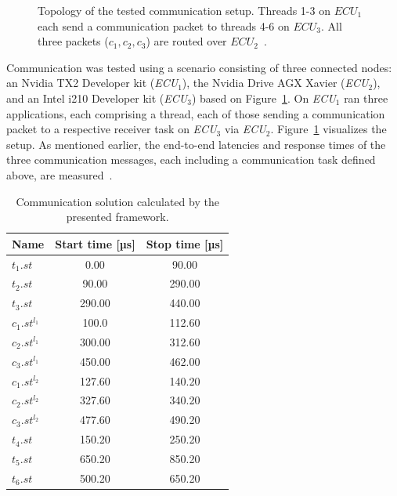      \begin{figure}[ht]
	\centering
	\caption{Topology of the tested communication setup. Threads 1-3 on $ECU_1$  each send a communication packet to threads 4-6 on $ ECU_3 $. All three packets ($c_1, c_2, c_3$) are routed over $ECU_2$~\cite{askaripoor2023designer}.}
	\label{fig:communication_topology}
    \end{figure}
    
    Communication was tested using a scenario consisting of three connected nodes: an Nvidia TX2 Developer kit (\textit{ECU$_1$}), the Nvidia Drive AGX Xavier (\textit{ECU$_2$}), and an Intel i210 Developer kit (\textit{ECU$_3$}) based on Figure~\ref{fig:communication_topology}. On\textit{ ECU$_1 $ } ran three applications, each comprising a thread, each of those sending a communication packet to a respective receiver task on \textit{ECU$_3$} via \textit{ECU$_2$}. Figure~\ref{fig:communication_topology} visualizes the setup. As mentioned earlier, the end-to-end latencies and response times of the three communication messages, each including a communication task defined above, are measured~\cite{askaripoor2023designer}.




    \begin{table}[ht]
	\begin{center}
		\caption{Communication solution calculated by the presented framework.}
		\begin{tabular}{@{}lcc@{}}
			\toprule
			Name & Start time [µs] & Stop time [µs] \\
			\midrule
			$t_1.st$ & 0.00 & 90.00 \\
			$t_2.st$ & 90.00 & 290.00 \\
			$t_3.st$ & 290.00 & 440.00 \\
			\midrule
			$c_1.st^{l_{1}}$ & 100.0 & 112.60 \\
			$c_2.st^{l_{1}}$ & 300.00 & 312.60 \\
			$c_3.st^{l_{1}}$ & 450.00 & 462.00 \\
			\midrule
			$c_1.st^{l_{2}}$ & 127.60 & 140.20 \\
			$c_2.st^{l_{2}}$ & 327.60 & 340.20 \\
			$c_3.st^{l_{2}}$ & 477.60 & 490.20 \\
			\midrule
	    	$t_4.st$ & 150.20 & 250.20 \\
			$t_5.st$ & 650.20 & 850.20 \\
			$t_6.st$ & 500.20 & 650.20 \\
			\bottomrule
		\end{tabular}
		\label{table:communication1}
	\end{center}
    \end{table}
    

